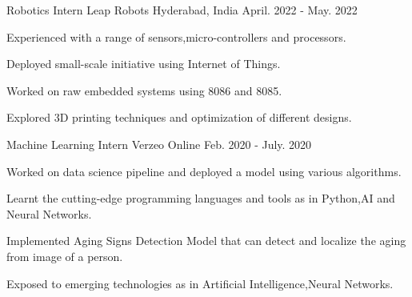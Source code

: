\documentclass[11pt, a4paper]{russell}
\begin{document}
\begin{cventries}
\vspace{3mm}
  \cventry
  {\small Robotics Intern} %
  {\normalsize Leap Robots} %
  {\small Hyderabad, India} %
  {\small April. 2022 - May. 2022 } %
    {
      \begin{cvitems} %
      \item \small Experienced with a range of sensors,micro-controllers and processors.
      \item \small Deployed small-scale initiative using Internet of Things.
      \item \small Worked on raw embedded systems using 8086 and 8085.
      \item \small Explored 3D printing techniques and optimization of different designs.
      \end{cvitems}
    }

\vspace{3mm}
  \cventry
  {\small Machine Learning Intern} %
  {\normalsize Verzeo} %
  {\small Online} %
  {\small Feb. 2020 - July. 2020 } %
    {
      \begin{cvitems} %
      \item \small Worked on data science pipeline and deployed a model using various algorithms.
      \item \small Learnt the cutting-edge programming languages and tools as in Python,AI and Neural Networks.
      \item \small Implemented Aging Signs Detection Model that can detect and localize the aging from image of a person.
      \item \small Exposed to emerging technologies as in Artificial Intelligence,Neural Networks.
      \end{cvitems}
    }
\end{cventries}

\vspace{4mm}
\end{document}
